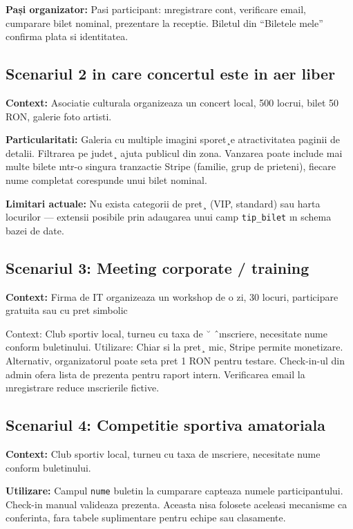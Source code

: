 \textbf{Pași organizator:} Pasi participant: ınregistrare cont, verificare email, cumparare bilet nominal, prezentare la receptie. Biletul din “Biletele mele” confirma plata si identitatea.

\subsection{Scenariul 2 in care concertul este in aer liber}

\textbf{Context:} Asociatie culturala organizeaza un concert local, 500 locrui, bilet 50 RON, galerie foto artisti.

\textbf{Particularitati:} Galeria cu multiple imagini sporet¸e atractivitatea paginii de detalii. Filtrarea pe judet¸ ajuta publicul din zona. Vanzarea poate include mai multe bilete ıntr-o singura tranzactie Stripe (familie, grup de prieteni), fiecare nume completat corespunde unui bilet nominal.

\textbf{Limitari actuale:} Nu exista categorii de pret¸ (VIP, standard) sau harta locurilor — extensii posibile prin adaugarea unui camp {\tt tip\_bilet} ın schema bazei de date.

\subsection{Scenariul 3: Meeting corporate / training}

\textbf{Context:} Firma de IT organizeaza un workshop de o zi, 30 locuri, participare gratuita sau cu pret simbolic

Context: Club sportiv local, turneu cu taxa de ˘ ˆınscriere, necesitate nume conform buletinului.
{Utilizare:} Chiar si la pret¸ mic, Stripe permite monetizare. Alternativ, organizatorul poate
seta pret 1 RON pentru testare. Check-in-ul din admin ofera lista de prezenta pentru raport intern. Verificarea email la ınregistrare reduce ınscrierile fictive.

\subsection{Scenariul 4: Competitie sportiva amatoriala}

\textbf{Context:} Club sportiv local, turneu cu taxa de ınscriere, necesitate nume conform buletinului.

\textbf{Utilizare:} Campul {\tt nume} buletin la cumparare capteaza numele participantului. Check-in manual valideaza prezenta. Aceasta nisa folosete aceleasi mecanisme ca conferinta, fara tabele suplimentare pentru echipe sau clasamente. 

